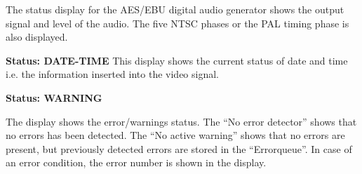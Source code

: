 The status display for the AES/EBU digital audio generator shows the output signal and level of the audio. The five NTSC phases or the PAL timing phase is also displayed.

\textbf{Status: DATE-TIME}
This display shows the current status of date and time i.e. the information inserted into the video signal.

\textbf{Status: WARNING}

The display shows the error/warnings status. The ``No error detector'' shows that no errors has been detected. The ``No active warning'' shows that no errors are present, but previously detected errors are stored in the ``Errorqueue''. In case of an error condition, the error number is shown in the display.
